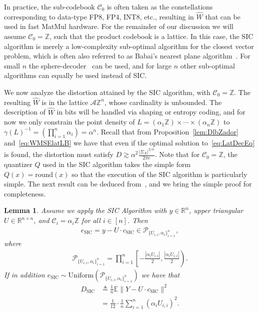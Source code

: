 \documentclass[journal]{IEEEtran}
\newcommand{\ZZ}{\mathbb{Z}}
\newcommand{\RR}{\mathbb{R}}
\newcommand{\Unif}{\mathrm{Uniform}}
\def\EE{\mathbb{E}}
\newcommand{\m}{\mathcal}
\newcommand{\OrComm}[1]{{\color{blue} [ \textbf{Or:} #1}]}
\newtheorem{remark}{Remark}
\newtheorem{lemma}{Lemma}
\begin{document}
\medskip


In practice, the sub-codebook $\m{C}_0$ is often taken as the constellations corresponding to data-type FP8, FP4, INT8, etc., resulting in $\hat{W}$ that can be used in fast MatMul hardware. For the remainder of our discussion we will assume $\m{C}_0=\ZZ$, such that the product codebook is a lattice. In this case, the SIC algorithm is merely a low-complexity sub-optimal  algorithm for the closest vector problem, which is often also referred to as Babai's nearest plane
algorithm~\cite{babai86}. For small $n$ the sphere-decoder~\cite{fincke1985improved,agrell2002closest} can be used, and for large $n$ other sub-optimal algorithms can equally be used instead of SIC.

We now analyze the distortion attained by the SIC algorithm, with $\m{C}_0=\ZZ$. The resulting $\hat{W}$ is in the lattice $\m{A}\ZZ^n$, whose cardinality is unbounded. The description of $\hat{W}$ in bits will be handled via shaping or entropy coding, and for now we only constrain the point density of $L=(\alpha_1\ZZ)\times\cdots\times(\alpha_n \ZZ)$ to $\gamma(L)^{-1}=\left(\prod_{i=1}^n\alpha_i\right)=\alpha^n$. Recall that from Proposition~\ref{lem:DlbZador} and~\eqref{eq:WMSElatLB} we have that even if the optimal solution to~\eqref{eq:LatDecEq} is found, the distortion must satisfy $D\gtrsim\alpha^2 \frac{|\Sigma_X|^{2/n}}{2\pi e}$. Note that for $\m{C}_0=\ZZ$, the quantizer $Q$ used in the SIC algorithm takes the simple form $Q(x)=\mathrm{round}(x)$ so that the execution of the SIC algorithm is particularly simple. The next result can be deduced from~\cite{babai86}, and we bring the simple proof for completeness.
\begin{lemma}
Assume we apply the SIC Algorithm with $y\in\RR^n$, upper triangular $U\in\RR^{n\times n}$, and $\m{C}_i=\alpha_i\ZZ$ for all $i\in[n]$. Then
\begin{align}
 e_{\mathrm{SIC}}=y-U\cdot c_{\mathrm{SIC}} \in \m{P}_{\{U_{i,i},\alpha_i\}_{i=1}^n},\nonumber
\end{align}
where
\begin{align}
\m{P}_{\{U_{i,i},\alpha_i\}_{i=1}^n}=\prod_{i=1}^n \left[-\frac{|\alpha_i U_{i,i}|}{2},\frac{|\alpha_i U_{i,i}|}{2} \right). \nonumber
\end{align}
If in addition $e_{\mathrm{SIC}}\sim\Unif(\m{P}_{\{U_{i,i},\alpha_i\}_{i=1}^n})$ we have that
\begin{align}
D_{\mathrm{SIC}}&\triangleq\frac{1}{n}\EE\|Y-U\cdot c_{\mathrm{SIC}}\|^2\nonumber\\
&=\frac{1}{12}\cdot\frac{1}{n}\sum_{i=1}^n (\alpha_i U_{i,i})^2.  
\label{eq:DsicError}
\end{align}
\label{lem:FundCellSIC}
\end{lemma}
\end{document}
